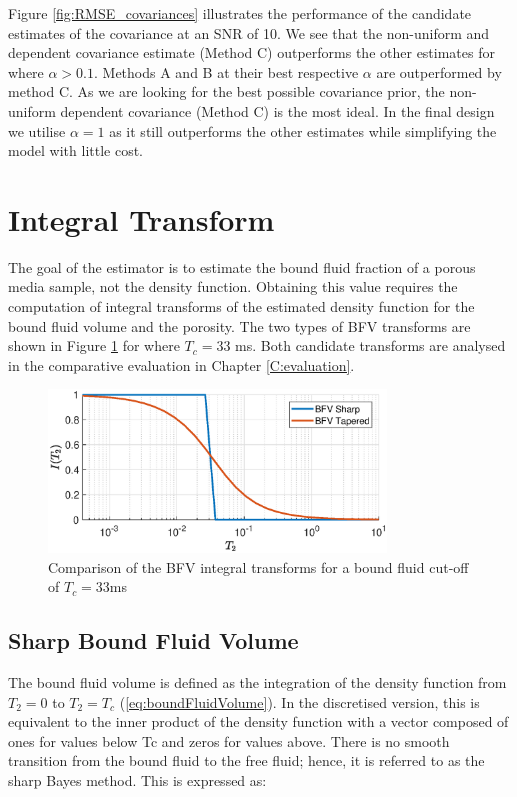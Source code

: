 Figure \ref{fig:RMSE_covariances} illustrates the performance of the candidate estimates of the covariance at an SNR of 10. We see that the non-uniform and dependent covariance estimate (Method C) outperforms the other estimates for where $\alpha > 0.1$. Methods A and B at their best respective $\alpha$ are outperformed by method C. As we are looking for the best possible covariance prior, the non-uniform dependent covariance (Method C) is the most ideal. In the final design we utilise $\alpha = 1$ as it still outperforms the other estimates while simplifying the model with little cost.




\section{Integral Transform} \label{sec:integralTransform}
The goal of the estimator is to estimate the bound fluid fraction of a porous media sample, not the density function. Obtaining this value requires the computation of integral transforms of the estimated density function for the bound fluid volume and the porosity. The two types of BFV transforms are shown in Figure \ref{fig:bfv_integral_trans} for where $T_c = 33$ ms. Both candidate transforms are analysed in the comparative evaluation in Chapter \ref{C:evaluation}.

\begin{figure} [htb!]
    \centering
    \includegraphics[width=0.8\textwidth]{design/bfv_integral.eps}
    \caption{Comparison of the BFV integral transforms for a bound fluid cut-off of $T_c = 33$ms}
    \label{fig:bfv_integral_trans}
\end{figure}

\subsection{Sharp Bound Fluid Volume}
The bound fluid volume is defined as the integration of the density function from $T_2=0$ to $T_2=T_c$ (\ref{eq:boundFluidVolume}). In the discretised version, this is equivalent to the inner product of the density function with a vector composed of ones for values below Tc and zeros for values above. There is no smooth transition from the bound fluid to the free fluid; hence, it is referred to as the sharp Bayes method. This is expressed as:

